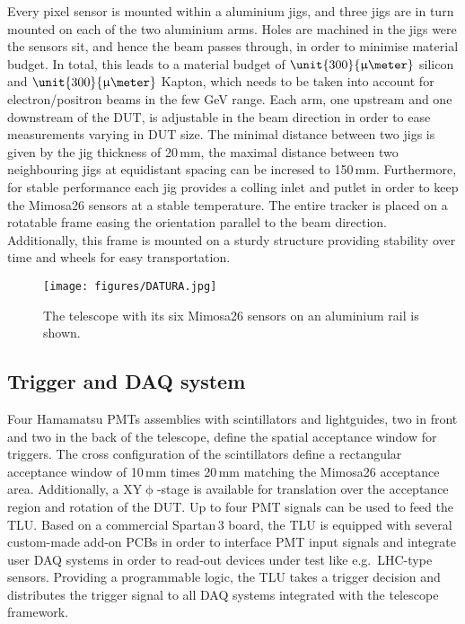 Every pixel sensor is mounted within a aluminium jigs, and three jigs are in turn mounted on each of the two aluminium arms. 
Holes are machined in the jigs were the sensors sit, and hence the beam passes through, in order to minimise material budget. 
In total, this leads to a material budget of $\unit{300}{\upmu\meter}$ silicon and $\unit{300}{\upmu\meter}$ Kapton, which needs to be taken into account for electron/positron beams in the few GeV range. 
Each arm, one upstream and one downstream of the DUT, is adjustable in the beam direction in order to ease measurements varying in DUT size.
The minimal distance between two jigs is given by the jig thickness of 20\,mm, the maximal distance between two neighbouring jigs at equidistant spacing can be incresed to 150\,mm.
Furthermore, for stable performance each jig provides a colling inlet and putlet in order to keep the Mimosa26 sensors at a stable temperature. 
The entire tracker is placed on a rotatable frame easing the orientation parallel to the beam direction. 
Additionally, this frame is mounted on a sturdy structure providing stability over time and wheels for easy transportation. 

\begin{figure}[tb]
	\center
	\texttt{[image: figures/DATURA.jpg]}
	\caption[The \Datura telescope]{The \Datura telescope with its six Mimosa26 sensors on an aluminium rail is shown.}
	\label{fig:datura-tscope}
\end{figure}

\subsection{Trigger and DAQ system}

Four Hamamatsu PMTs assemblies with scintillators and lightguides, two in front and two in the back of the telescope, define the spatial acceptance window for triggers. 
The cross configuration of the scintillators define a rectangular acceptance window of 10\,mm times 20\,mm matching the Mimosa26 acceptance area. 
Additionally, a XY$\upphi$-stage is available for translation over the acceptance region and rotation of the DUT. 
Up to four PMT signals can be used to feed the TLU. 
Based on a commercial Spartan\,3 board, the TLU is equipped with several custom-made add-on PCBs in order to interface PMT input signals
 and integrate user DAQ systems in order to read-out devices under test like e.g.~LHC-type sensors. 
Providing a programmable logic, the TLU  takes a trigger decision and distributes the trigger signal to all DAQ systems integrated with the telescope framework.

